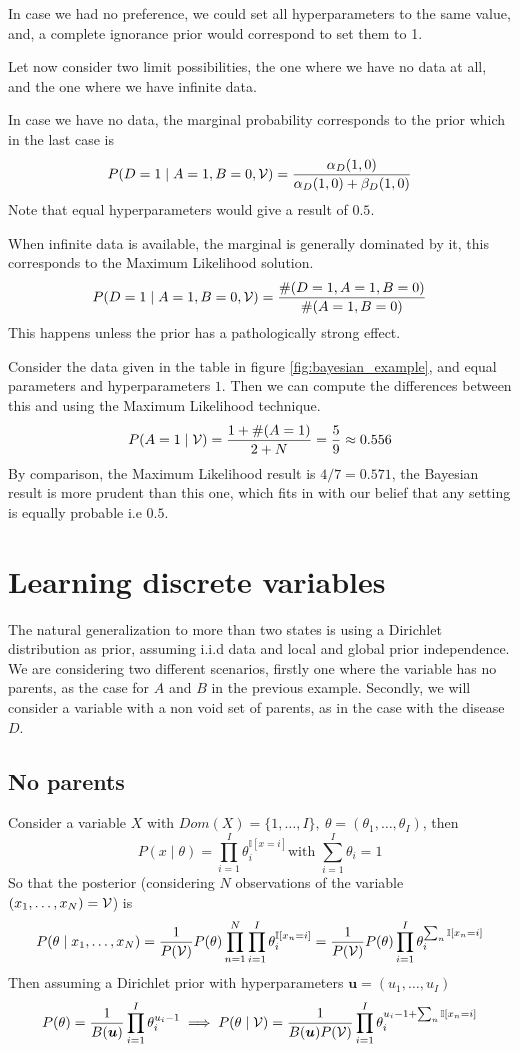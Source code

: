In case we had no preference, we could set all hyperparameters to the same
value, and, a complete ignorance prior would correspond to set them to 1.

Let now consider two limit possibilities, the one where we have no data at all,
and the one where we have infinite data.

In case we have no data, the marginal probability corresponds to the prior which
in the last case is
\[
   P(D = 1 \mid A = 1, B = 0, \mathcal{V}) = \frac{\alpha_{D}(1,0)}{\alpha_{D}(1,0) + \beta_{D}(1,0)}
 \]
 Note that equal hyperparameters would give a result of \(0.5\).

 When infinite data is available, the marginal is generally dominated by it,
 this corresponds to the Maximum Likelihood solution.
 \[
   P(D = 1 \mid A = 1, B = 0, \mathcal{V}) = \frac{\#(D = 1, A = 1 , B = 0)}{\#(A = 1, B = 0)}
 \]
 This happens unless the prior has a pathologically strong effect.

 Consider the data given in the table in figure \ref{fig:bayesian_example}, and
 equal parameters and hyperparameters \(1\). Then we can compute the differences
 between this and using the Maximum Likelihood technique.
 \[
   P(A = 1 \mid \mathcal{V}) = \frac{1 + \#(A = 1)}{2 + N} = \frac{5}{9} \approx 0.556
 \]
 By comparison, the Maximum Likelihood result is \(4/7 = 0.571\), the Bayesian
 result is more prudent than this one, which fits in with our belief that any
 setting is equally probable i.e \(0.5\).

 \section{Learning discrete variables}

 The natural generalization to more than two states is using a Dirichlet
 distribution as prior, assuming i.i.d data and local and global prior
 independence. We are considering two different scenarios, firstly one where the
 variable has no parents, as the case for \(A\) and \(B\) in the previous
 example. Secondly, we will consider a variable with a non void set of parents,
 as in the case with the disease \(D\).

 \subsection{No parents}

 Consider a variable \(X\) with
 \(Dom(X) = \{1, \dots, I\}, \ \theta = (\theta_{1},\dots, \theta_{I})\), then
 \[
   P(x \mid \theta) = \prod_{i = 1}^{I}\theta_{i}^{\mathbb{I}[x = i]} \text{
   with  } \sum_{i=1}^{I}\theta_{i} = 1
\]
So that the posterior (considering \(N\) observations of the variable
\((x_{1}, \dots, x_{N}) = \mathcal{V}\)) is
\[
  P(\theta \mid x_{1},\dots,x_{N}) = \frac{1}{P(\mathcal{V})} P(\theta) \prod_{n = 1}^{N}\prod_{i =1 }^{I}\theta_{i}^{\mathbb{I}[x_{n} = i]} =  \frac{1}{P(\mathcal{V})} P(\theta) \prod_{i = 1}^{I} \theta_{i}^{\sum_{n} \mathbb{I}[x_{n}=i]}
\]
Then assuming a Dirichlet prior with hyperparameters \(\bm{u} = (u_{1}, \dots, u_{I})\)
\[
  P(\theta) = \frac{1}{B(\bm{u})}\prod_{i =1}^{I}\theta_{i}^{u_{i}-1} \implies P(\theta \mid \mathcal{V}) = \frac{1}{B(\bm{u})P(\mathcal{V})}\prod_{i=1}^{I}\theta_{i}^{u_{i}-1 + \sum_{n}\mathbb{I}[x_{n} = i]}
\]

